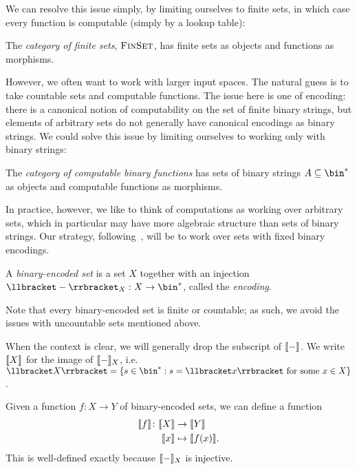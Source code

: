 We can resolve this issue simply, by limiting ourselves to finite sets, in which
case every function is computable (simply by a lookup table):

\begin{dfn}
  The \emph{category of finite sets}, ${\textsc{\text{FinSet}}}$, has finite sets as
  objects and functions as morphisms.
\end{dfn}

However, we often want to work with larger input spaces. The natural guess is to
take countable sets and computable functions. The issue here is one of encoding:
there is a canonical notion of computability on the set of finite binary
strings, but elements of arbitrary sets do not generally have canonical
encodings as binary strings. We could solve this issue by limiting
ourselves to working only with binary strings:
\begin{dfn}
  The \emph{category of computable binary functions}  has sets of binary strings
  $A\subseteq\bin^*$ as objects and computable functions as morphisms.
\end{dfn}

In practice, however, we like to think of computations as working over arbitrary
sets, which in particular may have more algebraic structure than sets of binary
strings. Our strategy, following~\cite{pavlovic-2014}, will be to work over sets
with fixed binary encodings.
\begin{dfn}
  A \emph{binary-encoded set} is a set $X$ together with an injection
  $\denote{-}_X: X\to\bin^*$, called the \emph{encoding}.
\end{dfn}

Note that every binary-encoded set is finite or countable; as such, we avoid the
issues with uncountable sets mentioned above.

\begin{ntn}
  When the context is clear, we will generally drop the subscript of
  $\llbracket - \rrbracket$. We write $\llbracket X \rrbracket$ for the image of $\llbracket - \rrbracket_X$, i.e.
  $\denote{X} = \{s\in\bin^*: s = \denote{x}\text{ for some }x\in X\}$.
\end{ntn}

Given a function $f: X\to Y$ of binary-encoded sets, we can define a function
  \begin{align*}
    \llbracket f \rrbracket \colon \llbracket X \rrbracket &\to \llbracket Y \rrbracket\\
    \llbracket x \rrbracket &\mapsto \llbracket f(x) \rrbracket.
  \end{align*}
This is well-defined exactly because $\llbracket - \rrbracket_X$ is injective.

